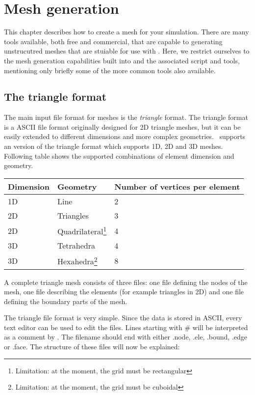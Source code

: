 \chapter{Mesh generation}\label{chap:meshes}

This chapter describes how to create a mesh for your \fluidity simulation. There
are many tools available, both free and commercial, that are capable to generating
unstrucutred meshes that are stuiable for use with \fluidity. Here, we restrict ourselves
to the mesh generation capabilities built into \fluidity and the associated script and
tools, mentioning only briefly some of the more common tools also available.

\section{The triangle format}\label{sect:triangle_format}

The main input file format for \fluidity meshes is the \emph{triangle} format.
The triangle format is a ASCII file format originally designed for 2D
triangle meshes, but it can be easily extended to different dimensions and
more complex geometries.  \fluidity\ supports an version of the triangle format
which supports 1D, 2D and 3D meshes.  Following table shows the supported
combinations of element dimension and geometry.

\begin{tabular}{ l l l }
\textbf{Dimension} & \textbf{Geometry} & \textbf{Number of vertices per element} \\ \hline
1D & Line & 2\\ 
2D & Triangles &  3 \\ 
2D & Quadrilateral\footnote{Limitation: at the moment, the grid must be rectangular} & 4 \\
3D & Tetrahedra & 4 \\ 
3D & Hexahedra\footnote{Limitation: at the moment, the grid must be cuboidal} & 8 \\
\end{tabular}

A complete triangle mesh consists of three files: one file defining the
nodes of the mesh, one file describing the elements (for example triangles
in 2D) and one file defining the boundary parts of the mesh.

The triangle file format is very simple. Since the data is stored in ASCII,
every text editor can be used to edit the files.  Lines starting with \# will
be interpreted as a comment by \fluidity.  The filename should end with
either .node, .ele, .bound, .edge or .face.  The structure of these files
will now be explained:

